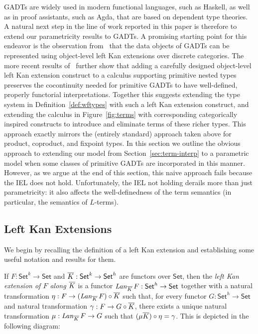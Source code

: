 \documentclass{lmcs}
\theoremstyle{plain}\newtheorem{satz}[thm]{Satz}
\newcommand{\set}{\mathsf{Set}}
\begin{document}
{GADTs are widely used in modern functional languages, such as Haskell,
as well as in proof assistants, such as Agda, that are based on
dependent type theories. A natural next step in the line of work
reported in this paper is therefore to extend our parametricity
results to GADTs. A promising starting point for this endeavor is the
observation from~\cite{jg08} that the data objects of GADTs can be
represented using object-level left Kan extensions over discrete
categories. The more recent results of~\cite{jp19} further show that
adding a carefully designed object-level left Kan extension construct
to a calculus supporting primitive nested types preserves the
cocontinuity needed for primitive GADTs to have well-defined, properly
functorial interpretations. Together this suggests extending the type
system in Definition~\ref{def:wftypes} with such a left Kan extension
construct, and extending the calculus in Figure~\ref{fig:terms} with
corresponding categorically inspired constructs to introduce and
eliminate terms of these richer types. This approach exactly mirrors
the (entirely standard) approach taken above for product, coproduct,
and fixpoint types. In this section we outline the obvious approach to
extending our model from Section~\ref{sec:term-interp} to a parametric
model when some classes of primitive GADTs are incorporated in this
manner. However, as we argue at the end of this section, this naive
approach fails because the IEL does not hold. Unfortunately, the IEL
not holding derails more than just parametricity: it also affects the
well-definedness of the term semantics (in particular, the semantics
of $L$-terms).

\subsection{Left Kan Extensions}\label{sec:lke}

We begin by recalling the definition of a left Kan extension and
establishing some useful notation and results for them.

\begin{defi}\label{def:lke}
If $F : \set^k \to \set$ and $\ol{K} : \set^k \to \set^h$ are functors
over $\set$, then the {\em left Kan extension of $F$ along $\overline{K}$} is
a functor $\mathit{Lan}_{\ol K}\,F : \set^h \to \set$ together with a
natural transformation $\eta : F \to (\mathit{Lan}_{\overline{K}}\,F)
\circ \overline{K}$
such that, for every functor $G : \set^h \to \set$ and natural
transformation $\gamma : F \to G \circ \overline{K}$, there exists a unique
natural transformation $\mu : \mathit{Lan}_{\overline{K}}\,F \to G$ such that
$(\mu {\overline{K}}) \circ \eta = \gamma$. This is depicted in the
following diagram:


\end{defi}}
\end{document}
